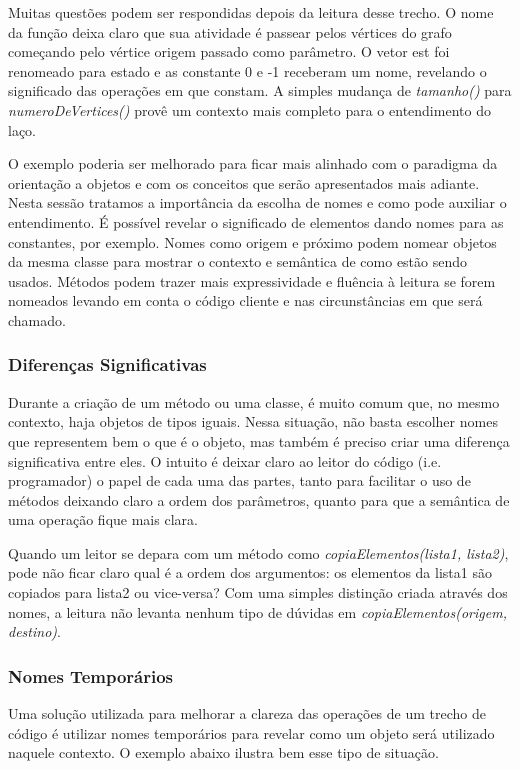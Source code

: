 Muitas questões podem ser respondidas depois da leitura desse trecho. O nome da função deixa claro que sua atividade é passear pelos vértices do grafo começando pelo vértice origem passado como parâmetro. O vetor est foi renomeado para estado e as constante 0 e -1 receberam um nome, revelando o significado das operações em que constam. A simples mudança de \textit{tamanho()} para \textit{numeroDeVertices()} provê um contexto mais completo para o entendimento do laço.
	
O exemplo poderia ser melhorado para ficar mais alinhado com o paradigma da orientação a objetos e com os conceitos que serão apresentados mais adiante. Nesta sessão tratamos a importância da escolha de nomes e como pode auxiliar o entendimento. É possível revelar o significado de elementos dando nomes para as constantes, por exemplo. Nomes como origem e próximo podem nomear objetos da mesma classe para mostrar o contexto e semântica de como estão sendo usados. Métodos podem trazer mais expressividade e fluência à leitura se forem nomeados levando em conta o código cliente e nas circunstâncias em que será chamado.

\subsubsection{Diferenças Significativas}
Durante a criação de um método ou uma classe, é muito comum que, no mesmo contexto, haja  objetos de tipos iguais. Nessa situação, não basta escolher nomes que representem bem o que é o objeto, mas também é preciso criar uma diferença significativa entre eles. O intuito é deixar claro ao leitor do código  (i.e. programador) o papel de cada uma das partes, tanto para facilitar o uso de métodos deixando claro a ordem dos parâmetros, quanto para que a semântica de uma operação fique mais clara.
	
Quando um leitor se depara com um método como \textit{copiaElementos(lista1, lista2)}, pode não ficar claro qual é a ordem dos argumentos: os elementos da lista1 são copiados para lista2 ou vice-versa? Com uma simples distinção criada através dos nomes, a leitura não levanta nenhum tipo de dúvidas em \textit{copiaElementos(origem, destino)}.

\subsubsection{Nomes Temporários}
Uma solução utilizada para melhorar a clareza das operações de um trecho de código é utilizar nomes temporários para revelar como um objeto será utilizado naquele contexto. O exemplo abaixo ilustra bem esse tipo de situação.

